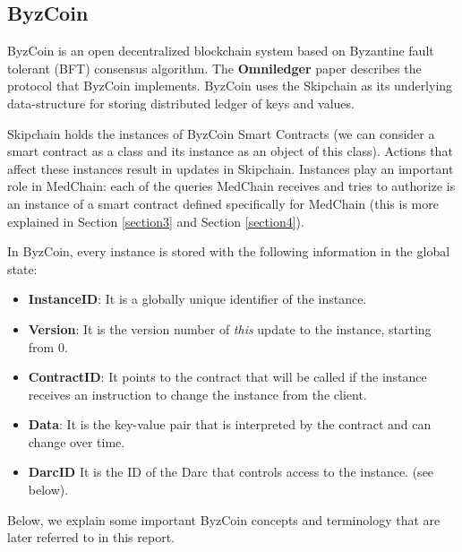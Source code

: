 \subsection{ByzCoin}\label{background:byzcoin}

 ByzCoin \cite{byzcoin:2019} is an open decentralized blockchain system based on Byzantine fault tolerant (BFT) consensus algorithm. The \textbf{Omniledger} paper \cite{kokoris2018omniledger} describes the protocol that ByzCoin implements. ByzCoin uses the Skipchain \cite{skipchain:2019} as its underlying data-structure for storing distributed ledger of keys and values. 

 Skipchain holds the instances of ByzCoin Smart Contracts (we can consider a smart contract as a class and its instance as an object of this class). Actions that affect these instances result in updates in Skipchain. Instances play an important role in MedChain: each of the queries MedChain receives and tries to authorize is an instance of a smart contract defined specifically for MedChain (this is more explained in Section \ref{section3} and Section \ref{section4}). 
 
 In ByzCoin, every instance is stored with the following information in the global state:

\begin{itemize}
    \item \textbf{InstanceID}: It is a globally unique identifier of the instance.
    \item \textbf{Version}: It is the version number of \textit{this} update to the instance, starting from 0.
    \item \textbf{ContractID}: It points to the contract that will be called if the instance receives an instruction to change the instance from the client.
    \item \textbf{Data}: It is the key-value pair that is interpreted by the contract and can change over time.
    \item \textbf{DarcID} It is the ID of the Darc that controls access to the instance. (see below).
\end{itemize}

 
 Below, we explain some important ByzCoin concepts and terminology that are later referred to in this report. 
 
